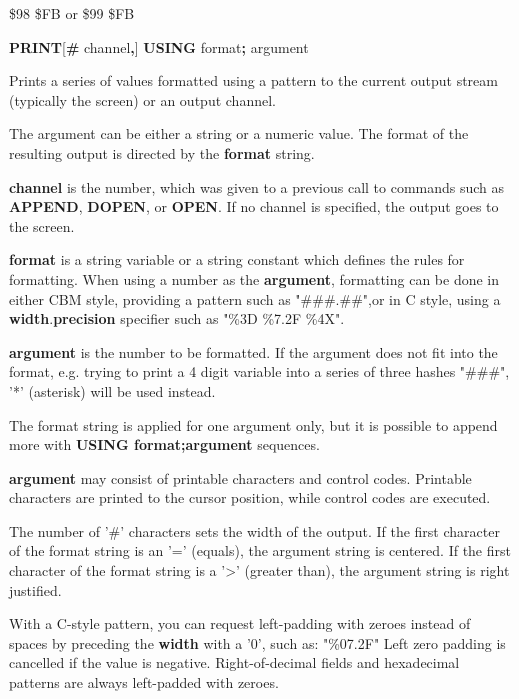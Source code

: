 \begin{description}[leftmargin=2cm,style=nextline]
\item [Token:]    \$98 \$FB or \$99 \$FB

\item [Format:]   {\bf PRINT}[{\bf\#} channel{\bf,}] {\bf USING} format{\bf;} argument

\item [Usage:]    Prints a series of values formatted using a pattern to the current output stream (typically the screen) or an output channel.

                  The argument can be either a string or a numeric value. The format of the resulting output is directed by the {\bf format} string.

                  {\bf channel} is the number, which was given to a previous call to commands such as {\bf APPEND}, {\bf DOPEN}, or {\bf OPEN}. If no channel is specified, the output goes to the screen.

                  {\bf format} is a string variable or a string constant which defines the rules for formatting. When using a number as the {\bf argument}, formatting can be done in either CBM style, providing a pattern such as "\#\#\#.\#\#",or in C style, using a {\bf width}.{\bf precision} specifier such as "\%3D \%7.2F \%4X".

                  {\bf argument} is the number to be formatted. If the argument does not fit into the format, e.g. trying to print a 4 digit variable into a series of three hashes "\#\#\#", '*' (asterisk) will be used instead.

\item [Remarks:]  The format string is applied for one argument only, but it is possible to append more with {\bf USING format;argument} sequences.

                  {\bf argument} may consist of printable characters and control codes. Printable characters are printed to the cursor position, while control codes are executed.
                
                  The number of '\#' characters sets the width of the output. If the first character of the format string is an '=' (equals), the argument string is centered. If the first character of the format string is a '>' (greater than), the argument string is right justified.

                  With a C-style pattern, you can request left-padding with zeroes instead of spaces by preceding the {\bf width} with a '0', such as: "\%07.2F" Left zero padding is cancelled if the value is negative. Right-of-decimal fields and hexadecimal patterns are always left-padded with zeroes.


\end{description}
